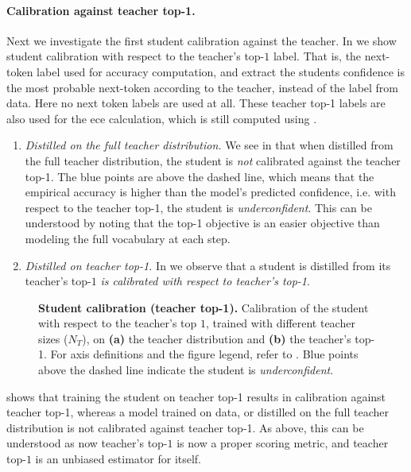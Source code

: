 \paragraph{Calibration against teacher top-1.} 
Next we investigate the first student calibration against the teacher.
In  we show student calibration with respect to the teacher's top-$1$ label.
That is, the next-token label used for accuracy computation, and extract the students confidence
is the most probable next-token according to the teacher, instead of the label from data.
Here no next token labels are used at all.
These teacher top-1 labels are also used for the \gls{ece} calculation, which is still computed using .
\begin{enumerate}
  \item \emph{Distilled on the full teacher distribution.} We see in  that when distilled from the full teacher distribution, the student is \emph{not} calibrated against the teacher top-1. The blue points are above the dashed line, which means that the empirical accuracy is higher than the model’s predicted confidence, i.e. with respect to the teacher top-1, the student is \emph{underconfident}.
  This can be understood by noting that the top-1 objective is an easier objective than modeling the full vocabulary at each step.
  \item \emph{Distilled on teacher top-1.} In  we observe that a student is distilled from its teacher's top-$1$ \emph{is calibrated with respect to teacher's top-1}.
\end{enumerate}
      \begin{figure}[h]
          \centering
          \hfill
          \caption{\textbf{Student calibration (teacher top-1).} Calibration of the student with respect to the teacher's top $1$, trained with different teacher sizes ($N_T$), on \textbf{(a)} the teacher distribution and \textbf{(b)} the teacher's top-1. For axis definitions and the figure legend, refer to . Blue points above the dashed line indicate the student is \emph{underconfident}.}
          \label{fig:calibration-student-ttop1-20n}
      \end{figure}
 shows that training the student on teacher top-1 results in calibration against teacher top-1,
whereas a model trained on data, or distilled on the full teacher distribution is not calibrated against teacher top-1.
As above, this can be understood as now
teacher's top-$1$ is now a proper scoring metric, and teacher top-$1$ is an unbiased estimator for itself.


